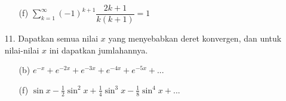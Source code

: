 \documentclass{article}
\begin{document}
\begin{enumerate}
\begin{enumerate}
            \item[(f)] $\displaystyle \sum_{k=1}^{\infty} (-1)^{k+1}\dfrac{2k+1}{k(k+1)} = 1$ 
        \end{enumerate}
        \item[11.] Dapatkan semua nilai $x$ yang menyebabkan deret konvergen, dan untuk nilai-nilai $x$ ini dapatkan jumlahannya.
        \begin{enumerate}
            \item[(b)] $\displaystyle e^{-x}+e^{-2x}+e^{-3x}+e^{-4x}+e^{-5x}+...$
            \item[(f)] $\displaystyle \sin x-\frac{1}{2}\sin^2 x+\frac{1}{4}\sin^3 x-\frac{1}{8}\sin^4 x+...$ 
        \end{enumerate}
    \end{enumerate}
\end{document}
